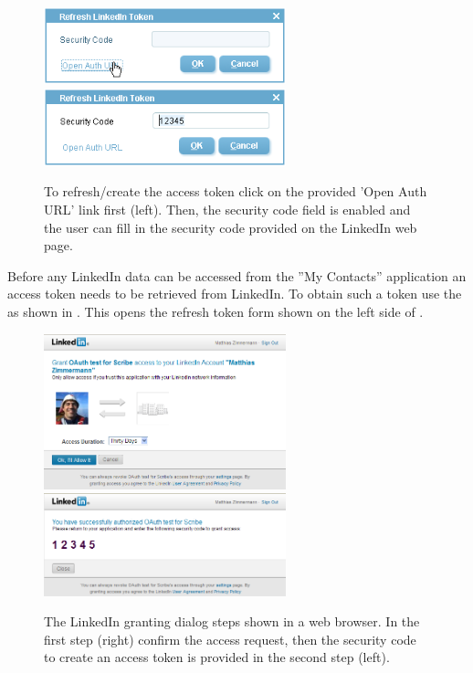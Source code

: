 \documentclass[a4paper,10pt,twoside]{book}
\begin{document}
\begin{figure}
\includegraphics[width=7cm]{my_contacts_rayo_openauthurl.png} \hspace{5mm}
\includegraphics[width=7cm]{my_contacts_rayo_entercode.png}
\caption{To refresh/create the access token click on the provided 'Open Auth URL' link first (left). 
Then, the security code field is enabled and the user can fill in the security code provided on the LinkedIn web page. }
\end{figure}

Before any LinkedIn data can be accessed from the ''My Contacts'' application an access token needs to be retrieved from LinkedIn. 
To obtain such a token use the  as shown in . 
This opens the refresh token form shown on the left side of . 

\begin{figure}
\includegraphics[width=7cm]{oauth_grant_access.png} \hspace{5mm}
\includegraphics[width=7cm]{oauth_security_code.png} 
\caption{The LinkedIn granting dialog steps shown in a web browser. 
In the first step (right) confirm the access request, then the security code to create an access token is provided in the second step (left).
}
\end{figure}
\end{document}
